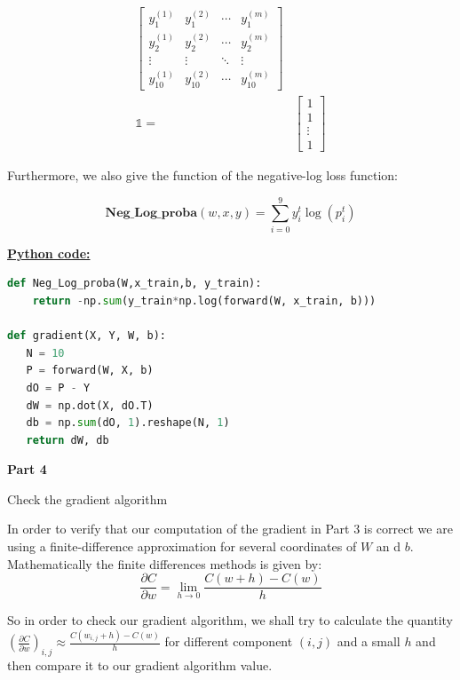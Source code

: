 \documentclass{article}
\begin{document}
\begin{align*}
\begin{bmatrix}
   y_1^{(1)} & y_1^{(2)}  &\cdots &  y_1^{(m)}  \\
   y_2^{(1)} & y_2^{(2)}  &\cdots &  y_2^{(m)}  \\
  \vdots & \vdots & \ddots  & \vdots \\
   y_{10}^{(1)} & y_{10}^{(2)}  &\cdots &  y_{10}^{(m)}
  \end{bmatrix} \\
   \mathbb{1} =& \begin{bmatrix} 1 \\ 1 \\ \vdots \\ 1 \end{bmatrix}
\end{align*}

Furthermore, we also give the function of the negative-log loss function:

$$\textbf{Neg\_Log\_proba}(w,x,y) = \sum_{i=0}^{9}y^t_i\log(p^t_i) $$


\noindent \underline{\textbf{Python code:}} \\
\begin{biomathy}
\begin{lstlisting}[language=python]
def Neg_Log_proba(W,x_train,b, y_train):
    return -np.sum(y_train*np.log(forward(W, x_train, b)))

def gradient(X, Y, W, b):
   N = 10
   P = forward(W, X, b)
   dO = P - Y
   dW = np.dot(X, dO.T)
   db = np.sum(dO, 1).reshape(N, 1)
   return dW, db
\end{lstlisting}
\end{biomathy}


\pagebreak
\begin{center}
\textbf{Part 4 }
\end{center}
\begin{biomathg}
 Check  the  gradient  algorithm
\end{biomathg}

\vspace{0.5cm}

\noindent In order to verify that our  computation of  the gradient in Part 3 is correct we are using a finite-difference approximation for several coordinates of $W$  an d $b$.  
\noindent Mathematically the finite differences methods is given by:
$$\frac{\partial C}{\partial w} = \lim_{h\rightarrow 0}\frac{C(w+h)-C(w)}{h} $$

 \noindent So in order to check   our gradient  algorithm, we shall try to calculate the quantity $\left(\frac{\partial C}{\partial w} \right)_{i,j} \approx \frac{C(w_{i,j}+h)-C(w)}{h} $  for
 different component $(i,j)$ and   a small $h$ and then compare it  to our gradient algorithm value.  \\
\end{document}
